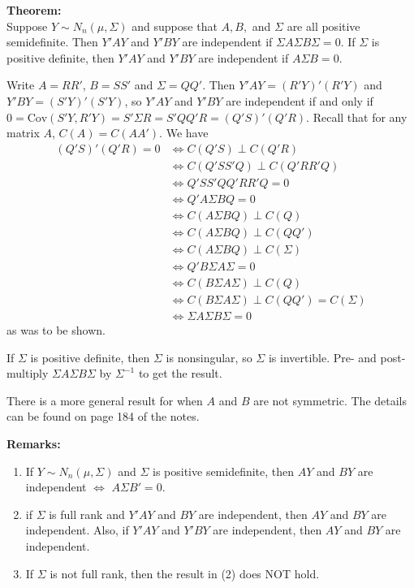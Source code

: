 \documentclass[12pt]{article}
\newcommand{\Cov}{\mathrm{Cov}}
\numberwithin{equation}{section}
\begin{document}
\textbf{Theorem:} \\
Suppose $Y \sim N_n(\mu, \Sigma)$ and suppose that $A, B,$ and $\Sigma$ are all positive semidefinite. Then $Y'AY$ and $Y'BY$ are independent if  $\Sigma A \Sigma B \Sigma = 0$. If $\Sigma$ is positive definite, then $Y'AY$ and $Y'BY$ are independent if $A\Sigma B = 0$.

Write $A = RR'$, $B = SS'$ and $\Sigma = QQ'$. Then $Y'AY = (R'Y)'(R'Y)$ and $Y'BY = (S'Y)'(S'Y)$, so $Y'AY$ and $Y'BY$ are independent if and only if $0 = \Cov(S'Y, R'Y) = S' \Sigma R = S'QQ'R = (Q'S)'(Q'R)$. Recall that for any matrix $A$, $C(A) = C(AA')$. We have
\begin{align*}
  (Q'S)'(Q'R) = 0 & \iff C(Q'S) \perp C(Q'R) \\
    &\iff C(Q'SS'Q) \perp C(Q'RR'Q) \\
    & \iff Q'SS'QQ'RR'Q = 0 \\
    & \iff Q'A \Sigma BQ = 0 \\
    & \iff C(A\Sigma BQ) \perp C(Q) \\
    & \iff C(A \Sigma BQ) \perp C(QQ') \\
    &\iff C(A \Sigma BQ) \perp C(\Sigma) \\
    &\iff Q'B \Sigma A \Sigma = 0 \\
    &\iff C(B \Sigma A \Sigma) \perp C(Q) \\
    &\iff C(B \Sigma A\Sigma) \perp C(QQ') = C(\Sigma) \\
    &\iff \Sigma A \Sigma B \Sigma = 0
\end{align*}
as was to be shown.

If $\Sigma$ is positive definite, then $\Sigma$ is nonsingular, so $\Sigma$ is invertible. Pre- and post-multiply $\Sigma A \Sigma B \Sigma$ by $\Sigma^{-1}$ to get the result.

There is a more general result for when $A$ and $B$ are not symmetric. The details can be found on page 184 of the notes.

\textbf{Remarks:}
\begin{enumerate}
  \item If $Y \sim N_n(\mu, \Sigma)$ and $\Sigma$ is positive semidefinite, then $AY$ and $BY$ are independent $\iff$ $A\Sigma B' = 0$.
  \item if $\Sigma$ is full rank and $Y'AY$ and $BY$ are independent, then $AY$ and $BY$ are independent. Also, if $Y'AY$ and $Y'BY$ are independent, then $AY$ and $BY$ are independent.
  \item If $\Sigma$ is not full rank, then the result in (2) does NOT hold.
\end{enumerate}
\end{document}
